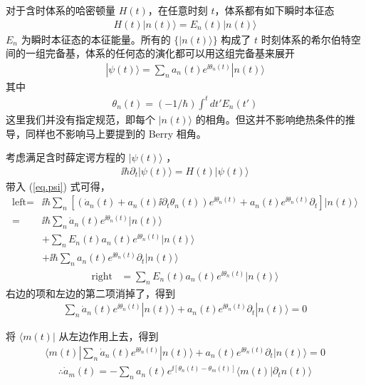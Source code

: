 对于含时体系的哈密顿量 $H(t)$，在任意时刻 $t$，体系都有如下瞬时本征态
\begin{align}
H(t)|n(t)\rangle=E_n(t)|n(t)\rangle
\end{align}
$E_n$ 为瞬时本征态的本征能量。所有的 $\{|n(t)\rangle\}$ 构成了 $t$ 时刻体系的希尔伯特空间的一组完备基，体系的任何态的演化都可以用这组完备基来展开
\begin{align}\label{eq.psi}
|\psi(t)\rangle=\sum_na_n(t)e^{\ii\theta_n(t)}|n(t)\rangle
\end{align}
其中
\begin{align}
\theta_n(t)=(-1/\hbar)\int^tdt'E_n(t')
\end{align}
这里我们并没有指定规范，即每个 $|n(t)\rangle$ 的相角。但这并不影响绝热条件的推导，同样也不影响马上要提到的 Berry 相角。

考虑满足含时薛定谔方程的 $|\psi(t)\rangle$ ，
\begin{align}
\ii\hbar\partial_t|\psi(t)\rangle=H(t)|\psi(t)\rangle
\end{align}
带入 (\ref{eq.psi}) 式可得，
\begin{align}
\text{left} 
=& \ii\hbar\sum_n[(\dot{a}_n(t)+a_n(t)\ii\partial_t\theta_n(t))e^{\ii\theta_n(t)}+a_n(t)e^{\ii\theta_n(t)}\partial_t]|n(t)\rangle\\
=& \ii\hbar\sum_n\dot{a}_n(t)e^{\ii\theta_n(t)}|n(t)\rangle\\
    & +\sum_{n}E_n(t)a_n(t)e^{\ii\theta_n(t)}|n(t)\rangle\\
    & +\ii\hbar\sum_na_{n}(t)e^{\ii\theta_n(t)}\partial_t|n(t)\rangle
\end{align}
\begin{align}
\text{right} &= \sum_{n}E_n(t)a_n(t)e^{\ii\theta_n(t)}|n(t)\rangle
\end{align}
右边的项和左边的第二项消掉了，得到
\begin{align}
\sum_n\dot{a}_n(t)e^{\ii\theta_n(t)}|n(t)\rangle+a_{n}(t)e^{\ii\theta_n(t)}\partial_t|n(t)\rangle=0
\end{align}

将 $\langle m(t)|$ 从左边作用上去，得到
\begin{align}
\langle m(t)|\sum_n\dot{a}_n(t)e^{\ii\theta_n(t)}|n(t)\rangle+a_{n}(t)e^{\ii\theta_n(t)}\partial_t|n(t)\rangle=0
\end{align}
\begin{align}
\therefore \dot{a}_m(t)=-\sum_na_{n}(t)e^{\ii[\theta_n(t)-\theta_m(t)]}\langle m(t)|\partial_tn(t)\rangle
\end{align}


